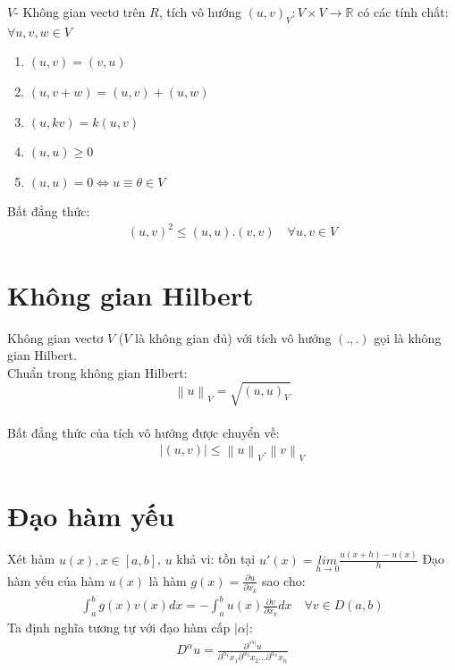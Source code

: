 \documentclass[14pt]{extreport}
\begin{document}
$V$- Không gian vectơ trên $R$, tích vô hướng $(u,v)_V: V\times V \rightarrow \mathbb{R}$ có các tính chất: $\forall u,v,w \in V$
\begin{enumerate}
\item $(u,v)=(v,u)$ 
\item $(u,v+w)=(u,v)+(u,w)$
\item $(u, kv) = k(u,v)$
\item $(u,u)\geq 0$
\item $(u,u)=0 \Leftrightarrow  u \equiv \theta  \in V$
\end{enumerate}

Bất đẳng thức:
\begin{align*}
(u,v)^2 \leq (u,u).(v,v) \quad \forall u,v \in V
\end{align*}

\section{Không gian Hilbert}
Không gian vectơ $V$ ($V$ là không gian đủ) với tích vô hướng $(.,.)$ gọi là không gian Hilbert.\\
Chuẩn trong không gian Hilbert:
$$ \left \| u \right \|_V = \sqrt{(u,u)_V}$$\\
Bất đẳng thức của tích vô hướng được chuyển về:
\begin{align*}
|(u,v)| \leq \left \| u \right \|_V.\left \| v \right \|_V
\end{align*}

\section{Đạo hàm yếu}
Xét hàm $u(x), x \in [a,b]$, $u$ khả vi: tồn tại $u'(x)=\underset{h \rightarrow  0}{lim}\frac{u(x+h)-u(x)}{h}$
Đạo hàm yếu của hàm $u(x)$ là hàm $g(x) = \frac{\partial u}{\partial x_k}$ sao cho:
\begin{align*}
\int_{a}^{b}g(x)v(x)dx = - \int_a^bu(x)\frac{\partial v}{\partial x_k}dx  \quad  \forall v \in D(a,b)
\end{align*}
Ta định nghĩa tương tự với đạo hàm cấp $|\alpha|$:
\begin{align*}
D^{\alpha}u = \frac{\partial^{|\alpha|}u }{\partial^{\alpha_1}x_1\partial^{\alpha_2}x_2 ...\partial^{\alpha_n}x_n  }
\end{align*}
\end{document}
